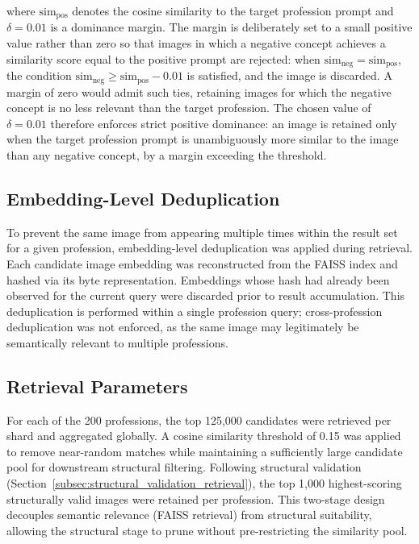where $\text{sim}_{\text{pos}}$ denotes the cosine similarity to the target
profession prompt and $\delta = 0.01$ is a dominance margin. The margin is
deliberately set to a small positive value rather than zero so that images
in which a negative concept achieves a similarity score equal to the
positive prompt are rejected: when $\text{sim}_{\text{neg}} =
\text{sim}_{\text{pos}}$, the condition $\text{sim}_{\text{neg}} \geq
\text{sim}_{\text{pos}} - 0.01$ is satisfied, and the image is discarded.
A margin of zero would admit such ties, retaining images for which the
negative concept is no less relevant than the target profession. The chosen
value of $\delta = 0.01$ therefore enforces strict positive dominance: an
image is retained only when the target profession prompt is unambiguously
more similar to the image than any negative concept, by a margin exceeding
the threshold.

\subsection{Embedding-Level Deduplication}

To prevent the same image from appearing multiple times within the result
set for a given profession, embedding-level deduplication was applied during
retrieval. Each candidate image embedding was reconstructed from the FAISS
index and hashed via its byte representation. Embeddings whose hash had
already been observed for the current query were discarded prior to result
accumulation. This deduplication is performed within a single profession
query; cross-profession deduplication was not enforced, as the same image
may legitimately be semantically relevant to multiple professions.

\subsection{Retrieval Parameters}

For each of the 200 professions, the top 125{,}000 candidates were
retrieved per shard and aggregated globally. A cosine similarity threshold
of 0.15 was applied to remove near-random matches while maintaining a
sufficiently large candidate pool for downstream structural filtering.
Following structural validation (Section~\ref{subsec:structural_validation_retrieval}),
the top 1{,}000 highest-scoring structurally valid images were retained per
profession. This two-stage design decouples semantic relevance (FAISS
retrieval) from structural suitability, allowing the structural stage to
prune without pre-restricting the similarity pool.

